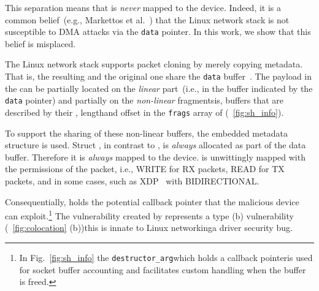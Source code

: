 This separation means that \skb{} is \emph{never} \DIFdelbegin {}\DIFdelend \DIFaddbegin {}\DIFaddend mapped to the device. Indeed, it is a common belief~(e.g., Markettos et al.~\cite{thunder}) \DIFdelbegin \DIFdel{, }\DIFdelend that the Linux network stack is not susceptible to DMA attacks via the \texttt{data} pointer. In this work, we show that this belief is misplaced.

The Linux network stack supports packet cloning by merely copying \skb{} metadata. That is, the resulting \skb{} and the original one share the \texttt{data} buffer~\cite{drivers2005linux}. The payload in the \skb{} can be partially located on the \emph{linear} part~(i.e., in the buffer indicated by the \texttt{data} pointer) and partially on the \emph{non-linear} fragments\DIFdelbegin {}\DIFdelend \DIFaddbegin {}\DIFaddend is, buffers that are described by their \page{}, length\DIFaddbegin \DIFadd{, }\DIFaddend and offset in the \texttt{frags} array of \shinfo{} (\DIFdelbegin {}\DIFdelend \DIFaddbegin {}\DIFaddend ~\ref{fig:sh_info}). 

To support the sharing of these non-linear buffers, the embedded \shinfo{} metadata structure is used.
Struct \shinfo{}, in contrast to \skb{}, is \emph{always} allocated as part of the data buffer. Therefore it is \emph{always} mapped to the device. \shinfo{} is unwittingly mapped with the permissions of the packet, i.e., WRITE for RX packets, READ for TX packets, and in some cases, such as XDP~\cite{xdp} with BIDIRECTIONAL.

Consequentially, \shinfo{} holds the potential callback pointer that the malicious device can exploit.\footnote{In Fig.~\ref{fig:sh_info} the \texttt{destructor\_arg}\DIFaddbegin \DIFadd{, }\DIFaddend which holds a callback pointer\DIFaddbegin \DIFadd{, }\DIFaddend is used for socket buffer accounting and facilitates custom handling when the buffer is freed.} The \subpage{} vulnerability created by \shinfo{} \DIFdelbegin \DIFdel{, }\DIFdelend represents a type (b) vulnerability (\DIFdelbegin {}\DIFdelend \DIFaddbegin {}\DIFaddend ~\ref{fig:colocation} (b))\DIFdelbegin {}\DIFdelend \DIFaddbegin \DIFadd{: }\DIFaddend this is innate to Linux networking\DIFdelbegin {}\DIFdelend \DIFaddbegin {}\DIFaddend a driver security bug. 

